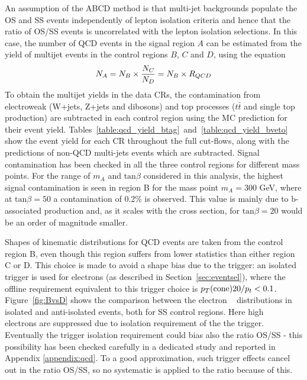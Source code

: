 An assumption of the ABCD method is that multi-jet backgrounds
populate the OS and SS events independently of lepton isolation
criteria and hence that the ratio of OS/SS events is uncorrelated 
with the lepton isolation selections. In this case, the number of QCD events in the signal region $A$ 
can be estimated from the yield of multijet events in the control regions $B$, $C$ and $D$, using the equation
\begin{equation} \label{eqn:qcdest}
N_{A}  = N_{B} \times \frac{N_{C}}{N_{D}} =  N_{B} \times R_{QCD}
\end{equation}
To obtain the multijet yields in the data CRs, the contamination
from electroweak (W+jets, Z+jets and dibosons) and top processes
($t\bar{t}$ and single top production) are  subtracted in each control region 
using the MC prediction for their event yield.  Tables~\ref{table:qcd_yield_btag}~and~\ref{table:qcd_yield_bveto}
show the event yield
for each CR throughout the full cut-flows, along with the
predictions of non-QCD multi-jets events which are subtracted.
Signal contamination has been checked in all the three control regions for different 
mass points. For the range of $m_{A}$ and $\mathrm{tan}\beta$ considered in this analysis, the highest signal contamination 
is seen in region B for the mass point $m_{A} = 300$ GeV, where at $\mathrm{tan}\beta = 50$ a contamination 
of 0.2\% is observed. This value is mainly due to b-associated production and,
as it scales with the cross section, for $\mathrm{tan}\beta = 20$ would be an order of magnitude smaller.

Shapes of kinematic distributions for QCD events are taken from the
control region B, even though this region suffers from lower statistics than either region C or D.
This choice is made to avoid a shape bias due to the trigger:  an isolated trigger is used for electrons (as described in Section~\ref{sec:eventsel}), where the offline requirement equivalent to this trigger choice is $p_{T}(\mathrm{cone})20/p_{t} <0.1$.
Figure~\ref{fig:BvsD} shows the comparison between the electron \pt~ distributions in isolated and anti-isolated events, both for SS control regions. Here high \pt~ electrons are suppressed due to isolation requirement of the the trigger. 
Eventually the trigger isolation requirement could
bias also the ratio OS/SS - this possibility has been checked carefully
in a dedicated study and reported in Appendix \ref{appendix:qcd}.
To a good approximation, such trigger effects cancel out in the ratio
OS/SS, so no systematic is applied to the ratio because of this.

